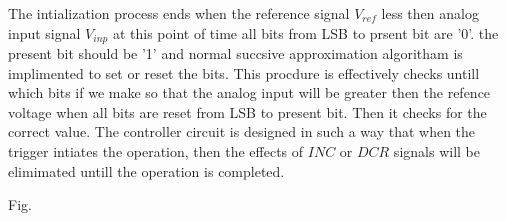 \documentclass[conference]{IEEEtran}
\begin{document}
	The intialization process ends when the reference signal $V_{ref}$ less then analog input signal $V_{inp}$ at this point of time all bits from LSB to prsent bit are '0'. the present bit should be '1' and normal succsive approximation algoritham is implimented to set or reset the bits. This procdure is effectively checks untill which bits if we make so that the analog input will be greater then the refence voltage when all bits are reset from LSB to present bit. Then it checks for the correct value. The controller circuit is designed in such a way that when the trigger intiates the operation, then the effects of $INC$ or $DCR$ signals will be elimimated untill the operation is completed.  \par


	Fig. 










\end{document}
